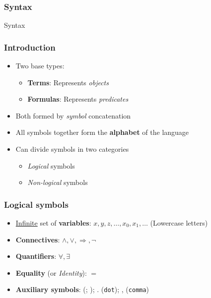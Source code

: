 \documentclass{beamer}
\begin{document}
            \subsubsection{Syntax}
                \begin{frame}
                    \begin{center}
                        \begin{Huge}
                            \textcolor{title_blue}{Syntax}
                        \end{Huge}
                    \end{center}
                \end{frame}

                \begin{frame}
                    \frametitle{Introduction}
                    \begin{itemize}
                        \item Two base types:
                            \begin{itemize}
                                \item \textbf{Terms}: Represents \textit{objects}
                                \item \textbf{Formulas}: Represents \textit{predicates}
                            \end{itemize}
                        \item Both formed by \textit{symbol} concatenation
                        \item All symbols together form the \textbf{alphabet} of the language
                        \item Can divide symbols in two categories
                            \begin{itemize}
                                \item \textit{Logical} symbols
                                \item \textit{Non-logical} symbols
                            \end{itemize}
                    \end{itemize}
                \end{frame}

                \begin{frame}
                    \frametitle{Logical symbols}
                    \begin{itemize}
                        \item \underline{Infinite} set of \textbf{variables}: $ x, y, z, \dots, x_0, x_1, \dots $ (Lowercase letters)
                        \item \textbf{Connectives}: $ \wedge, \vee, \Rightarrow, \neg $
                        \item \textbf{Quantifiers}: $ \forall, \exists $
                        \item \textbf{Equality} (or \textit{Identity}): $ = $
                        \item \textbf{Auxiliary symbols}: (; ); . (\texttt{dot}); , (\texttt{comma})
                    \end{itemize}
                \end{frame}
\end{document}
